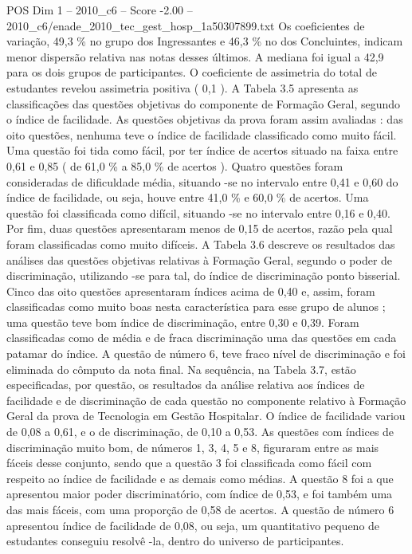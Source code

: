 \begin{textsample}{POS Dim 1 – 2010\_c6 – Score -2.00 – 2010\_c6/enade\_2010\_tec\_gest\_hosp\_1a50307899.txt}
Os coeficientes de variação, 49,3 \% no grupo dos Ingressantes e 46,3 \% no dos Concluintes, indicam menor dispersão relativa nas notas desses últimos.
A mediana foi igual a 42,9 para os dois grupos de participantes.
O coeficiente de assimetria do total de estudantes revelou assimetria positiva ( 0,1 ).
A Tabela 3.5 apresenta as classificações das questões objetivas do componente de Formação Geral, segundo o índice de facilidade.
As questões objetivas da prova foram assim avaliadas : das oito questões, nenhuma teve o índice de facilidade classificado como muito fácil.
Uma questão foi tida como fácil, por ter índice de acertos situado na faixa entre 0,61 e 0,85 ( de 61,0 \% a 85,0 \% de acertos ).
Quatro questões foram consideradas de dificuldade média, situando -se no intervalo entre 0,41 e 0,60 do índice de facilidade, ou seja, houve entre 41,0 \% e 60,0 \% de acertos.
Uma questão foi classificada como difícil, situando -se no intervalo entre 0,16 e 0,40.
Por fim, duas questões apresentaram menos de 0,15 de acertos, razão pela qual foram classificadas como muito difíceis.
A Tabela 3.6 descreve os resultados das análises das questões objetivas relativas à Formação Geral, segundo o poder de discriminação, utilizando -se para tal, do índice de discriminação ponto bisserial.
Cinco das oito questões apresentaram índices acima de 0,40 e, assim, foram classificadas como muito boas nesta característica para esse grupo de alunos ; uma questão teve bom índice de discriminação, entre 0,30 e 0,39.
Foram classificadas como de média e de fraca discriminação uma das questões em cada patamar do índice.
A questão de número 6, teve fraco nível de discriminação e foi eliminada do cômputo da nota final.
Na sequência, na Tabela 3.7, estão especificadas, por questão, os resultados da análise relativa aos índices de facilidade e de discriminação de cada questão no componente relativo à Formação Geral da prova de Tecnologia em Gestão Hospitalar.
O índice de facilidade variou de 0,08 a 0,61, e o de discriminação, de 0,10 a 0,53.
As questões com índices de discriminação muito bom, de números 1, 3, 4, 5 e 8, figuraram entre as mais fáceis desse conjunto, sendo que a questão 3 foi classificada como fácil com respeito ao índice de facilidade e as demais como médias.
A questão 8 foi a que apresentou maior poder discriminatório, com índice de 0,53, e foi também uma das mais fáceis, com uma proporção de 0,58 de acertos.
A questão de número 6 apresentou índice de facilidade de 0,08, ou seja, um quantitativo pequeno de estudantes conseguiu resolvê -la, dentro do universo de participantes.

\end{textsample}
